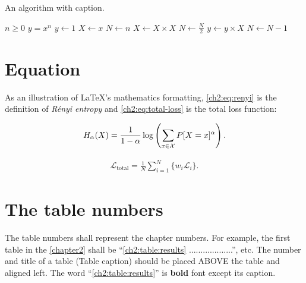 \begin{algorithm}[h]
\caption{An algorithm with caption.}
\label{ch2:algo:my-algo}
\normalsize\singlespacing
\begin{algorithmic}[1] %
    \Require $n \geq 0$
    \Ensure $y = x^n$
    \State $y \gets 1$
    \State $X \gets x$
    \State $N \gets n$
        \State $X \gets X \times X$
        \State $N \gets \frac{N}{2}$  
        \State $y \gets y \times X$
        \State $N \gets N - 1$
    \EndIf
    \EndWhile
\end{algorithmic}
\end{algorithm}



\section{Equation} 

\begin{paragraph}
As an illustration of \LaTeX's mathematics formatting,
\autoref{ch2:eq:renyi} is the definition of {\em R\'enyi entropy} and \autoref{ch2:eq:total-loss} is the total loss function:
\end{paragraph}

\begin{equation}
\label{ch2:eq:renyi}
H_{\alpha}(X) =
\frac{1}{1-\alpha}
\log \left(\sum_{x \in {\cal X}}P[X=x]^{\alpha} \right) .
\end{equation}

\begin{equation} 
\label{ch2:eq:total-loss}
\begin{aligned}
\mathcal{L}_{\textrm{total}} = \frac{1}{N}\sum_{i=1}^{N}\{w_i\mathcal{L}_i\}. 
\end{aligned}
\end{equation}


\section{The table numbers}

\begin{paragraph}
The table numbers shall represent the chapter numbers. For example, the first table in the \autoref{chapter2} shall be ``\autoref{ch2:table:results} ...................'', etc. The number and title of a table (Table caption) should be placed ABOVE the table and aligned left. The word ``\autoref{ch2:table:results}'' is \textbf{bold} font except its caption. 
\end{paragraph}

